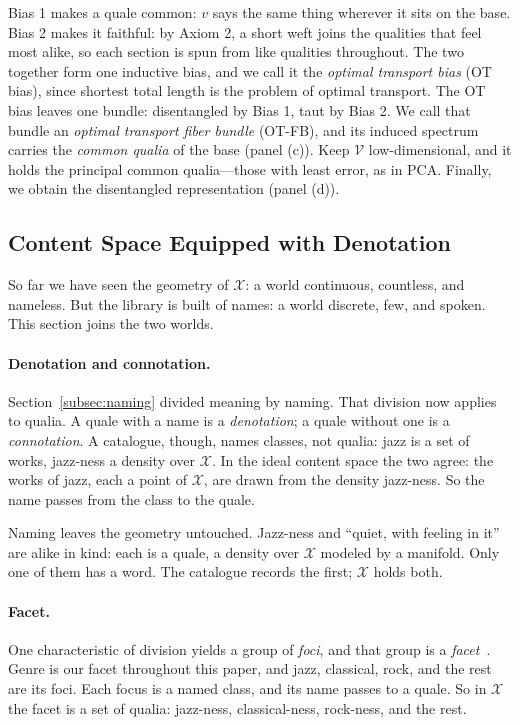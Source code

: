\noindent
Bias 1 makes a quale common: $v$ says the same thing wherever it sits on the
base. Bias 2 makes it faithful: by Axiom 2, a short weft joins the qualities
that feel most alike, so each section is spun from like qualities throughout.
The two together form one inductive bias, and we call it the \textit{optimal
    transport bias} (OT bias), since shortest total length is the problem of optimal
transport. The OT bias leaves one bundle: disentangled by Bias 1, taut by
Bias 2. We call that bundle an \textit{optimal transport fiber bundle} (OT-FB),
and its induced spectrum carries the \textit{common qualia} of the base
(panel (c)). Keep $\mathcal{V}$ low-dimensional, and it holds the principal
common qualia---those with least error, as in PCA{}. Finally, we obtain the
disentangled representation (panel (d)).


\subsection{Content Space Equipped with
    Denotation}\label{subsec:denotation}

So far we have seen the geometry of $\mathcal{X}$: a world continuous,
countless, and nameless. But the library is built of names: a world discrete,
few, and spoken. This section joins the two worlds.

\paragraph{Denotation and connotation.}
Section~\ref{subsec:naming} divided meaning by naming. That division now applies
to qualia. A quale with a name is a \textit{denotation}; a quale without one is
a \textit{connotation}. A catalogue, though, names classes, not qualia: jazz is
a set of works, jazz-ness a density over $\mathcal{X}$. In the ideal content
space the two agree: the works of jazz, each a point of $\mathcal{X}$, are drawn
from the density jazz-ness. So the name passes from the class to the quale.

Naming leaves the geometry untouched. Jazz-ness and ``quiet, with feeling in
it'' are alike in kind: each is a quale, a density over $\mathcal{X}$ modeled by
a manifold. Only one of them has a word. The catalogue records the first;
$\mathcal{X}$ holds both.

\paragraph{Facet.}
One characteristic of division yields a group of \textit{foci}, and that group
is a \textit{facet}~\citep{Vickery1960}. Genre is our facet throughout this
paper, and jazz, classical, rock, and the rest are its foci. Each focus is a
named class, and its name passes to a quale. So in $\mathcal{X}$ the facet is a
set of qualia: jazz-ness, classical-ness, rock-ness, and the rest.

